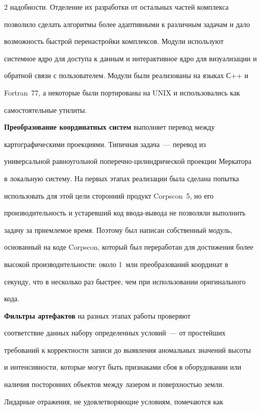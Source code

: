 \begin{multicols}{2}
надобности. Отделение их разработки от остальных частей комплекса 

позволило сделать алгоритмы более адаптивными к различным задачам и дало 

возможность быстрой перенастройки комплексов. Модули используют 

системное ядро для доступа к данным и интерактивное ядро для визуализации и 

обратной связи с пользователем. Модули были реализованы на языках С++ и 

Fortran~77, а некоторые были портированы на UNIX и использовались как 

самостоятельные утилиты.

   

   \textbf{Преобразование координатных систем} выполняет перевод между 

картографическими проекциями. Типичная задача~--- перевод из 

универсальной равноугольной поперечно-цилиндрической проекции Меркатора 

в локальную систему. На первых этапах реализации была сделана попытка 

использовать для этой цели сторонний продукт Corpscon~5, но его 

производительность и устаревший код ввода-вывода не позволяли выполнить 

задачу за приемлемое время. Поэтому был написан собственный модуль, 

основанный на коде Corpscon, который был переработан для достижения более 

высокой производительности: около 1~млн преобразований координат в 

секунду, что в несколько раз быстрее, чем при использовании оригинального 

кода.

   

   \textbf{Фильтры артефактов} на разных этапах работы проверяют 

соответствие данных набору определенных условий~--- от простейших 

требований к корректности записи до выявления аномальных значений высоты 

и интенсивности, которые могут быть признаками сбоя в оборудовании или 

наличия посторонних объектов между лазером и поверхностью земли. 

Лидарные отражения, не удовлетворяющие условиям, помечаются как 


\end{multicols}
